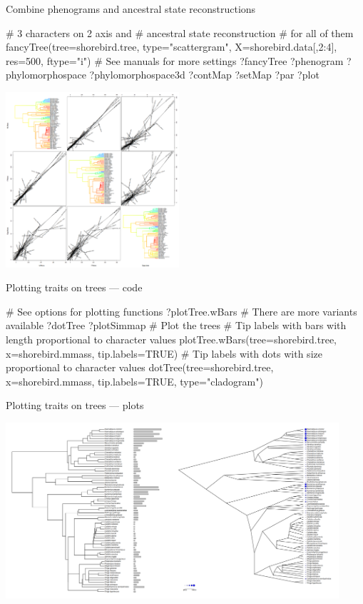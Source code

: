 \documentclass[compress, ucs, xelatex, 11pt, xcolor=svgnames, aspectratio=169,
	hyperref={
		bookmarks=true,
		unicode=true,
		colorlinks=true,
		pdftitle={Molecular data in R},
		plainpages=false,
		pdfauthor={Vojtech Zeisek},
		pdfsubject={Course about phylogeny and evolution in R},
		pdfcreator={XeLaTeX},
		pdfkeywords={R, evolution, phylogeny, molecular data},
		linkcolor=Crimson, %
		anchorcolor=Magenta, %
		citecolor=Magenta, %
		filecolor=Magenta, %
		menucolor=Magenta, %
		urlcolor=DodgerBlue, %
		pdftex},
	url={hyphens, lowtilde} %
	]{beamer}
\begin{document}
\begin{frame}[fragile]{Combine phenograms and ancestral state reconstructions}
	\begin{multicols}{2}
		\begin{spluscode}
    # 3 characters on 2 axis and
    # ancestral state reconstruction
    # for all of them
    fancyTree(tree=shorebird.tree,
      type="scattergram",
      X=shorebird.data[,2:4],
      res=500, ftype="i")
    # See manuals for more settings
    ?fancyTree
    ?phenogram
    ?phylomorphospace
    ?phylomorphospace3d
    ?contMap
    ?setMap
    ?par
    ?plot
		\end{spluscode}
		\begin{center}
			\includegraphics[height=6.5cm]{phenogram-ace.png}
		\end{center}
	\end{multicols}
\end{frame}

\begin{frame}[fragile]{Plotting traits on trees --- code}
	\begin{spluscode}
    # See options for plotting functions
    ?plotTree.wBars # There are more variants available
    ?dotTree
    ?plotSimmap
    # Plot the trees
    # Tip labels with bars with length proportional to character values
    plotTree.wBars(tree=shorebird.tree, x=shorebird.mmass, tip.labels=TRUE)
    # Tip labels with dots with size proportional to character values
    dotTree(tree=shorebird.tree, x=shorebird.mmass, tip.labels=TRUE,
      type="cladogram")
	\end{spluscode}
\end{frame}

\begin{frame}{Plotting traits on trees --- plots}
	\begin{center}
		\includegraphics[height=6.5cm]{treeval.png}
	\end{center}
\end{frame}
\end{document}
